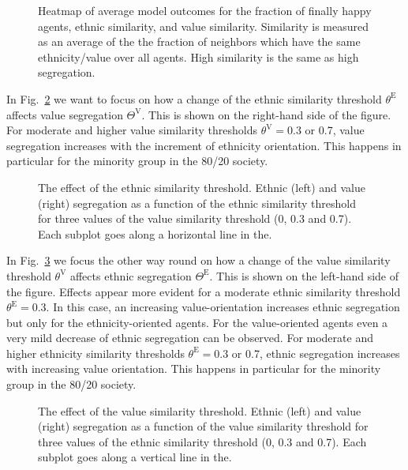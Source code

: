 \documentclass{ws-acs}
\begin{document}
\begin{figure}[th]
\centerline{}
\vspace*{8pt}
\caption{Heatmap of average model outcomes for the fraction of finally happy agents, ethnic similarity, and value similarity. Similarity is measured as an average of the the fraction of neighbors which have the same ethnicity/value over all agents. High similarity is the same as high segregation.}
\label{fig:Heatmap}
\end{figure}

In Fig.~\ref{fig:Detail1} we want to focus on how a change of the ethnic similarity threshold $\theta^\text{E}$ affects value segregation $\Theta^\text{V}$. This is shown on the right-hand side of the figure. For moderate and higher value similarity thresholds $\theta^\text{V}=0.3$ or 0.7, value segregation increases with the increment of  ethnicity orientation. This happens in particular for the minority group in the 80/20 society. 


\begin{figure}[th]
\centerline{}
\vspace*{8pt}
\caption{The effect of the ethnic similarity threshold. Ethnic (left) and value (right) segregation as a function of the ethnic similarity threshold for three values of the value similarity threshold (0, 0.3 and 0.7). Each subplot goes along a horizontal line in the.}
\label{fig:Detail1}
\end{figure}

In Fig.~\ref{fig:Detail2} we focus the other way round on how a change of the value similarity threshold $\theta^\text{V}$ affects ethnic segregation $\Theta^\text{E}$. This is shown on the left-hand side of the figure. Effects appear more evident for a moderate ethnic similarity threshold $\theta^\text{E} = 0.3$. In this case, an increasing value-orientation increases ethnic segregation but only for the ethnicity-oriented agents. For the value-oriented agents even a very mild decrease of ethnic segregation can be observed. For moderate and higher ethnicity similarity thresholds $\theta^\text{E}=0.3$ or 0.7, ethnic segregation increases with increasing value orientation. This happens in particular for the minority group in the 80/20 society.

\begin{figure}[th]
\centerline{}
\vspace*{8pt}
\caption{The effect of the value similarity threshold. Ethnic (left) and value (right) segregation as a function of the value similarity threshold for three values of the ethnic similarity threshold (0, 0.3 and 0.7). Each subplot goes along a vertical line in the.}
\label{fig:Detail2}
\end{figure}
\end{document}
